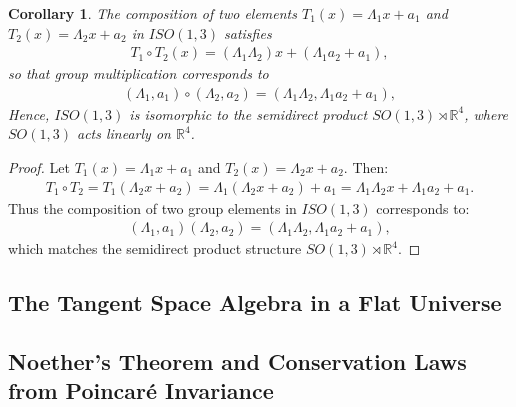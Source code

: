 \documentclass{amsart}
\newtheorem{corollary}[theorem]{Corollary}
\theoremstyle{definition}
\theoremstyle{remark}
\begin{document}
\begin{corollary}
  The composition of two elements $T_1(x) = \Lambda_1 x + a_1$ and $T_2(x) = \Lambda_2 x + a_2$ in $ISO(1, 3)$ satisfies
  \begin{align*}
    T_1 \circ T_2(x) = (\Lambda_1 \Lambda_2) x + (\Lambda_1 a_2 + a_1),
  \end{align*}
  so that group multiplication corresponds to
  \begin{align*}
    (\Lambda_1, a_1) \circ (\Lambda_2, a_2) = (\Lambda_1 \Lambda_2, \Lambda_1 a_2 + a_1),
  \end{align*}
  Hence, $ISO(1, 3)$ is isomorphic to the semidirect product $SO(1, 3) \rtimes \mathbb{R}^4$, where $SO(1,3)$ acts linearly on $\mathbb{R}^4$.
\end{corollary}
\begin{proof}
  Let $T_1(x) = \Lambda_1 x + a_1$ and $T_2(x) = \Lambda_2 x + a_2$. Then:
  \begin{align*}
    T_1 \circ T_2 = T_1(\Lambda_2 x + a_2) = \Lambda_1 (\Lambda_2 x + a_2) + a_1 = \Lambda_1 \Lambda_2 x + \Lambda_1 a_2 + a_1.
  \end{align*}
  Thus the composition of two group elements in $ISO(1,3)$ corresponds to:
  \begin{align*}
    (\Lambda_1, a_1) (\Lambda_2, a_2) = (\Lambda_1\Lambda_2, \Lambda_1 a_2 + a_1),
  \end{align*}
  which matches the semidirect product structure $SO(1,3) \rtimes \mathbb{R}^4$.
\end{proof}

\subsection{The Tangent Space Algebra in a Flat Universe}
\label{subsec:poincare_algebra}


\subsection{Noether's Theorem and Conservation Laws from Poincaré Invariance}
\label{subsec:noether_poincare}
\end{document}
